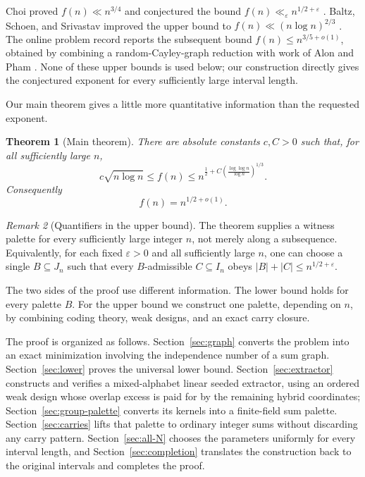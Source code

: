 \documentclass[11pt]{article}
\numberwithin{equation}{section}
\newtheorem{theorem}{Theorem}[section]
\theoremstyle{definition}
\theoremstyle{remark}
\newtheorem{remark}[theorem]{Remark}
\begin{document}
Choi proved $f(n)\ll n^{3/4}$ and conjectured the bound
$f(n)\ll_\varepsilon n^{1/2+\varepsilon}$ \cite{Choi1971}.  Baltz, Schoen, and Srivastav
improved the upper bound to $f(n)\ll(n\log n)^{2/3}$
\cite{BSS2000}.  The online problem record reports the subsequent bound
$f(n)\le n^{3/5+o(1)}$, obtained by combining a random-Cayley-graph
reduction with work of Alon and Pham
\cite{ErdosProblems788,AlonPham2025}.  None of these
upper bounds is used below; our construction directly gives the conjectured
exponent for every sufficiently large interval length.

Our main theorem gives a little more quantitative information than the
requested exponent.

\begin{theorem}[Main theorem]\label{thm:main}
There are absolute constants $c,C>0$ such that, for all sufficiently
large $n$,
\[
 c\sqrt{n\log n}\le f(n)
 \le n^{\frac12+C\left(
   \frac{\log\log n}{\log n}\right)^{1/3}}.
\]
Consequently
\[
 f(n)=n^{1/2+o(1)}.
\]
\end{theorem}

\begin{remark}[Quantifiers in the upper bound]\label{rem:quantifiers}
The theorem supplies a witness palette for every sufficiently large
integer $n$, not merely along a subsequence.  Equivalently, for each fixed
$\varepsilon>0$ and all sufficiently large $n$, one can choose a single
$B\subseteq J_n$ such that every $B$-admissible $C\subseteq I_n$ obeys
$|B|+|C|\le n^{1/2+\varepsilon}$.
\end{remark}

The two sides of the proof use different information.  The lower bound
holds for every palette $B$.  For the upper bound we construct one palette,
depending on $n$, by combining coding theory, weak designs, and an exact
carry closure.

The proof is organized as follows.  Section~\ref{sec:graph} converts the
problem into an exact minimization involving the independence number of a
sum graph.  Section~\ref{sec:lower} proves the universal lower bound.
Section~\ref{sec:extractor} constructs and verifies a mixed-alphabet linear
seeded extractor, using an ordered weak design whose overlap excess is paid
for by the remaining hybrid coordinates;
Section~\ref{sec:group-palette} converts its kernels into a finite-field sum
palette.  Section~\ref{sec:carries} lifts that palette to ordinary integer
sums without discarding any carry pattern.
Section~\ref{sec:all-N} chooses the parameters uniformly for every interval
length, and Section~\ref{sec:completion} translates the construction back
to the original intervals and completes the proof.
\end{document}
